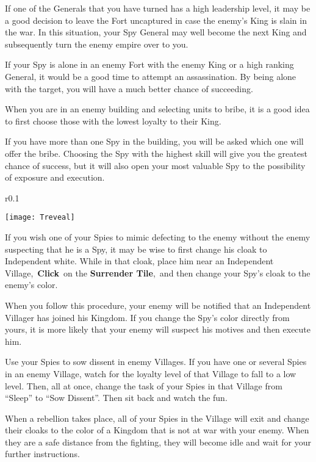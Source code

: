 If one of the Generals that you have turned has a high leadership level, it may be a good decision to leave the Fort uncaptured in case the enemy’s King is slain in the war. In this situation, your Spy General may well become the next King and subsequently turn the enemy empire over to you.

If your Spy is alone in an enemy Fort with the enemy King or a high ranking General, it would be a good time to attempt an assassination. By being alone with the target, you will have a much better chance of succeeding.

When you are in an enemy building and selecting units to bribe, it is a good idea to first choose those with the lowest loyalty to their King.

If you have more than one Spy in the building, you will be asked which one will offer the bribe. Choosing the Spy with the highest skill will give you the greatest chance of success, but it will also open your most valuable Spy to the possibility of exposure and execution.

\begin{wrapfigure}{r}{0.1\textwidth}
    \vspace{-20pt}
    \begin{center}
        \texttt{[image: Treveal]}
    \end{center}
    \vspace{-20pt}
\end{wrapfigure}

If you wish one of your Spies to mimic defecting to the enemy without the enemy suspecting that he is a Spy, it may be wise to first change his cloak to Independent white. While in that cloak, place him near an Independent Village, \textbf{Click} on the \textbf{Surrender Tile}, and then change your Spy’s cloak to the enemy’s color.

When you follow this procedure, your enemy will be notified that an Independent Villager has joined his Kingdom. If you change the Spy’s color directly from yours, it is more likely that your enemy will suspect his motives and then execute him.

Use your Spies to sow dissent in enemy Villages. If you have one or several Spies in an enemy Village, watch for the loyalty level of that Village to fall to a low level. Then, all at once, change the task of your Spies in that Village from “Sleep” to “Sow Dissent”. Then sit back and watch the fun.

When a rebellion takes place, all of your Spies in the Village will exit and change their cloaks to the color of a Kingdom that is not at war with your enemy. When they are a safe distance from the fighting, they will become idle and wait for your further instructions.

